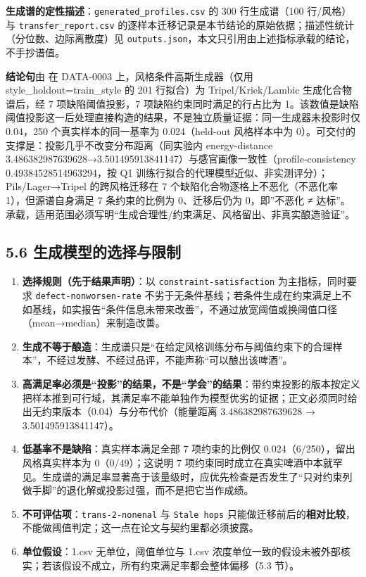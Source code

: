 \documentclass[
  11pt,
]{ctexart}
\newcounter{none} %
\providecommand{\tightlist}{%
  \setlength{\itemsep}{0pt}\setlength{\parskip}{0pt}}
\begin{document}
\textbf{生成谱的定性描述}：\texttt{generated\_\allowbreak{}profiles.\allowbreak{}csv} 的 300
行生成谱（100 行/风格）与 \texttt{transfer\_\allowbreak{}report.\allowbreak{}csv}
的逐样本迁移记录是本节结论的原始依据；描述性统计（分位数、边际离散度）见
\texttt{outputs.json}，本文只引用由上述指标承载的结论，不手抄谱值。

\textbf{结论句}由 在 DATA-0003 上，风格条件高斯生成器（仅用
style\_holdout=train\_style 的 201 行拟合）为 Tripel/Kriek/Lambic
生成化合物谱后，经 7 项缺陷阈值投影，7 项缺陷约束同时满足的行占比为
1。该数值是缺陷阈值投影这一后处理直接构造的结果，不是独立质量证据：同一生成器未投影时仅
0.04，250 个真实样本的同一基率为 0.024（held-out 风格样本中为
0）。可交付的支撑是：投影几乎不改变分布距离（同实验内 energy-distance
3.486382987639628→3.501495913841147）与感官画像一致性（profile-consistency
0.49384528514963294，按 Q1
训练行拟合的代理模型近似、非实测评分）；Pils/Lager→Tripel 的跨风格迁移在
7 个缺陷化合物逐格上不恶化（不恶化率 1），但源谱自身满足 7
条约束的比例为 0、迁移后仍为 0，即''不恶化 ≠ 达标''。
承载，适用范围必须写明``生成合理性/约束满足、风格留出、非真实酿造验证''。

\subsection{5.6
生成模型的选择与限制}\label{ux751fux6210ux6a21ux578bux7684ux9009ux62e9ux4e0eux9650ux5236}

\begin{enumerate}
\def\labelenumi{\arabic{enumi}.}
\tightlist
\item
  \textbf{选择规则（先于结果声明）}：以 \texttt{constraint-satisfaction}
  为主指标，同时要求 \texttt{defect-nonworsen-rate}
  不劣于无条件基线；若条件生成在约束满足上不如基线，如实报告``条件信息未带来改善''，不通过放宽阈值或换阈值口径（mean→median）来制造改善。
\item
  \textbf{生成不等于酿造}：生成谱只是``在给定风格训练分布与阈值约束下的合理样本''，不经过发酵、不经过品评，不能声称``可以酿出该啤酒''。
\item
  \textbf{高满足率必须是``投影''的结果，不是``学会''的结果}：带约束投影的版本按定义把样本推到可行域，其满足率不能单独作为模型优劣的证据；正文必须同时给出无约束版本（0.04）与分布代价（能量距离
  3.486382987639628 → 3.501495913841147）。
\item
  \textbf{低基率不是缺陷}：真实样本满足全部 7 项约束的比例仅
  0.024（6/250），留出风格真实样本为 0（0/49）；这说明 7
  项约束同时成立在真实啤酒中本就罕见。生成谱的满足率显著高于该量级时，应优先检查是否发生了``只对约束列做手脚''的退化解或投影过强，而不是把它当作成绩。
\item
  \textbf{不可评估项}：\texttt{trans-2-nonenal} 与 \texttt{Stale\ hops}
  只能做迁移前后的\textbf{相对比较}，不能做阈值判定；这一点在论文与契约里都必须披露。
\item
  \textbf{单位假设}：1.csv 无单位，阈值单位与 1.csv
  浓度单位一致的假设未被外部核实；若该假设不成立，所有约束满足率都会整体偏移（5.3
  节）。
\end{enumerate}
\end{document}
